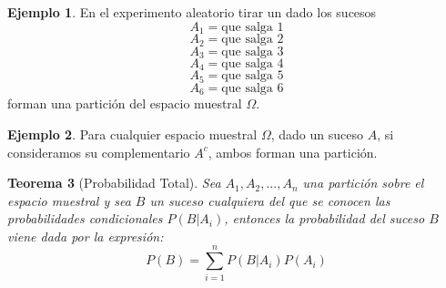 \documentclass[]{book}
\theoremstyle{plain}
\newtheorem{theorem}{Teorema}[section]
\theoremstyle{definition}
\newtheorem{example}[theorem]{Ejemplo}
\theoremstyle{definition} %
\begin{document}
\begin{example}
  En el experimento aleatorio tirar un dado los sucesos
\[A_1 = \text{que salga 1}\] 
\[A_2 = \text{que salga 2}\]
\[A_3 = \text{que salga 3}\] 
\[A_4 = \text{que salga 4}\]
\[A_5 = \text{que salga 5}\] 
\[A_6 = \text{que salga 6}\] 
forman
una partición del espacio muestral \(\Omega\).

\end{example}
 

\begin{example}
  Para cualquier espacio muestral \(\Omega\), dado un suceso \(A\), si
consideramos su complementario \(A^c\), ambos forman una partición.

\end{example}

 
\begin{theorem}[Probabilidad Total]
  Sea \(A_{1},A_{2},...,A_{n}\) una partición sobre el espacio muestral y
sea \(B\) un suceso cualquiera del que se conocen las probabilidades
condicionales \(P(B|A_i)\), entonces la probabilidad del suceso \(B\)
viene dada por la expresión:
\[{\displaystyle P(B)=\sum _{i=1}^{n}P(B|A_{i})P(A_{i})} \]
 
\end{theorem}
\end{document}
